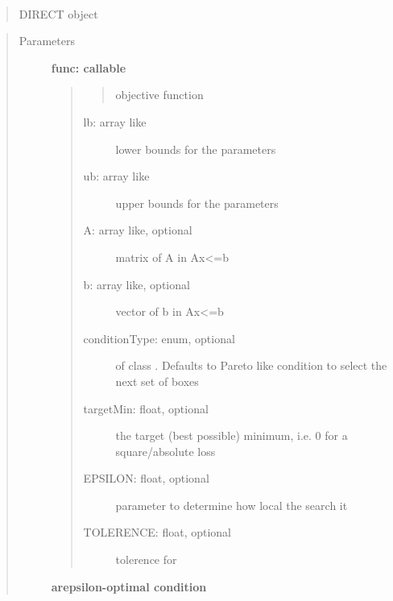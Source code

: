 \documentclass[letterpaper,10pt,english]{sphinxmanual}
\begin{document}
\begin{fulllineitems}
~\begin{quote}

DIRECT object
\end{quote}
\begin{quote}\begin{description}
\item[{Parameters}] \leavevmode
\textbf{func: callable}
\begin{quote}
\begin{quote}

objective function
\end{quote}
\begin{description}
\item[{lb: array like}] \leavevmode
lower bounds for the parameters

\item[{ub: array like}] \leavevmode
upper bounds for the parameters

\item[{A: array like, optional}] \leavevmode
matrix of A in Ax\textless{}=b

\item[{b: array like, optional}] \leavevmode
vector of b in Ax\textless{}=b

\item[{conditionType: enum, optional}] \leavevmode
of class .  Defaults to Pareto like condition
to select the next set of boxes

\item[{targetMin: float, optional}] \leavevmode
the target (best possible) minimum, i.e. 0 for a square/absolute loss

\item[{EPSILON: float, optional}] \leavevmode
parameter to determine how local the search it

\item[{TOLERENCE: float, optional}] \leavevmode
tolerence for

\end{description}
\end{quote}

\textbf{arepsilon-optimal condition}

\end{description}\end{quote}



\end{fulllineitems}
\end{document}
